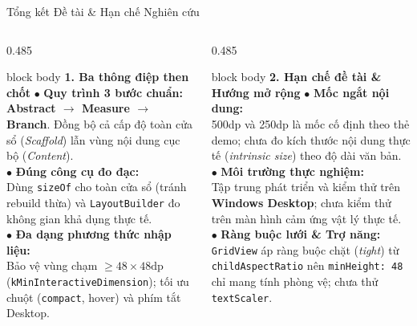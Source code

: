 \documentclass[aspectratio=169, 10pt]{beamer}
\begin{document}
\begin{frame}{Tổng kết Đề tài \& Hạn chế Nghiên cứu}
  \vspace{-0.15cm}
  \begin{columns}[T]
    \begin{column}{0.485\textwidth}
      \begin{beamercolorbox}[rounded=true, shadow=false, wd=\textwidth, sep=5.5pt]{block body}
        \textbf{\normalsize\color{blue!80!black}1. Ba thông điệp then chốt}
        \vskip 0.1cm
        \footnotesize
        $\bullet$ \textbf{Quy trình 3 bước chuẩn:}\\
        \textbf{Abstract $\rightarrow$ Measure $\rightarrow$ Branch}. Đồng bộ cả cấp độ toàn cửa sổ (\textit{Scaffold}) lẫn vùng nội dung cục bộ (\textit{Content}).\\[0.16cm]
        $\bullet$ \textbf{Đúng công cụ đo đạc:}\\
        Dùng \texttt{sizeOf} cho toàn cửa sổ (tránh rebuild thừa) và \texttt{LayoutBuilder} đo không gian khả dụng thực tế.\\[0.16cm]
        $\bullet$ \textbf{Đa dạng phương thức nhập liệu:}\\
        Bảo vệ vùng chạm $\ge 48\times 48\text{dp}$ (\texttt{kMinInteractiveDimension}); tối ưu chuột (\texttt{compact}, hover) và phím tắt Desktop.
      \end{beamercolorbox}
    \end{column}

    \begin{column}{0.485\textwidth}
      \begin{beamercolorbox}[rounded=true, shadow=false, wd=\textwidth, sep=5.5pt]{block body}
        \textbf{\normalsize\color{blue!80!black}2. Hạn chế đề tài \& Hướng mở rộng}
        \vskip 0.1cm
        \footnotesize
        $\bullet$ \textbf{Mốc ngắt nội dung:}\\
        500dp và 250dp là mốc cố định theo thẻ demo; chưa đo kích thước nội dung thực tế (\textit{intrinsic size}) theo độ dài văn bản.\\[0.16cm]
        $\bullet$ \textbf{Môi trường thực nghiệm:}\\
        Tập trung phát triển và kiểm thử trên \textbf{Windows Desktop}; chưa kiểm thử trên màn hình cảm ứng vật lý thực tế.\\[0.16cm]
        $\bullet$ \textbf{Ràng buộc lưới \& Trợ năng:}\\
        \texttt{GridView} áp ràng buộc chặt (\textit{tight}) từ \texttt{childAspectRatio} nên \texttt{minHeight: 48} chỉ mang tính phòng vệ; chưa thử \texttt{textScaler}.
      \end{beamercolorbox}
    \end{column}
  \end{columns}
  \vspace{0.15cm}
\end{frame}
\end{document}

